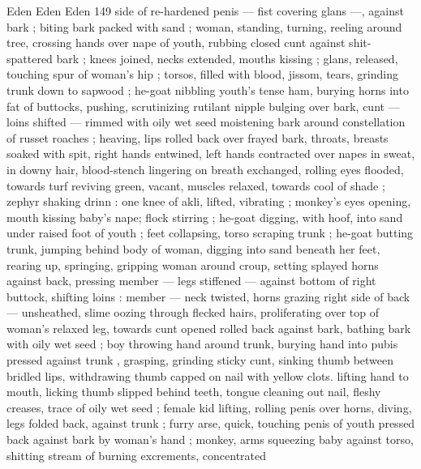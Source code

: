 Eden Eden Eden 149
side of re-hardened penis — fist covering glans —, against bark ;
biting bark packed with sand ; woman, standing, turning, reeling
around tree, crossing hands over nape of youth, rubbing closed cunt
against shit-spattered bark ; knees joined, necks extended, mouths
kissing ; glans, released, touching spur of woman's hip ; torsos, filled
with blood, jissom, tears, grinding trunk down to sapwood ; he-goat
nibbling youth's tense ham, burying horns into fat of buttocks,
pushing, scrutinizing rutilant nipple bulging over bark, cunt — loins
shifted — rimmed with oily wet seed moistening bark around
constellation of russet roaches ; heaving, lips rolled back over frayed
bark, throats, breasts soaked with spit, right hands entwined, left
hands contracted over napes in sweat, in downy hair, blood-stench
lingering on breath exchanged, rolling eyes flooded, towards turf
reviving green, vacant, muscles relaxed, towards cool of shade ;
zephyr shaking drinn : one knee of akli, lifted, vibrating ; monkey's
eyes opening, mouth kissing baby's nape; flock stirring ; he-goat
digging, with hoof, into sand under raised foot of youth ; feet
collapsing, torso scraping trunk ; he-goat butting trunk, jumping
behind body of woman, digging into sand beneath her feet, rearing
up, springing, gripping woman around croup, setting splayed horns
against back, pressing member — legs stiffened — against bottom
of right buttock, shifting loins : member — neck twisted, horns
grazing right side of back — unsheathed, slime oozing through
flecked hairs, proliferating over top of woman's relaxed leg, towards
cunt opened rolled back against bark, bathing bark with oily wet seed
; boy throwing hand around trunk, burying hand into pubis pressed
against trunk , grasping, grinding sticky cunt, sinking thumb between
bridled lips, withdrawing thumb capped on nail with yellow clots.
lifting hand to mouth, licking thumb slipped behind teeth, tongue
cleaning out nail, fleshy creases, trace of oily wet seed ; female kid
lifting, rolling penis over horns, diving, legs folded back, against
trunk ; furry arse, quick, touching penis of youth pressed back
against bark by woman's hand ; monkey, arms squeezing baby
against torso, shitting stream of burning excrements, concentrated

